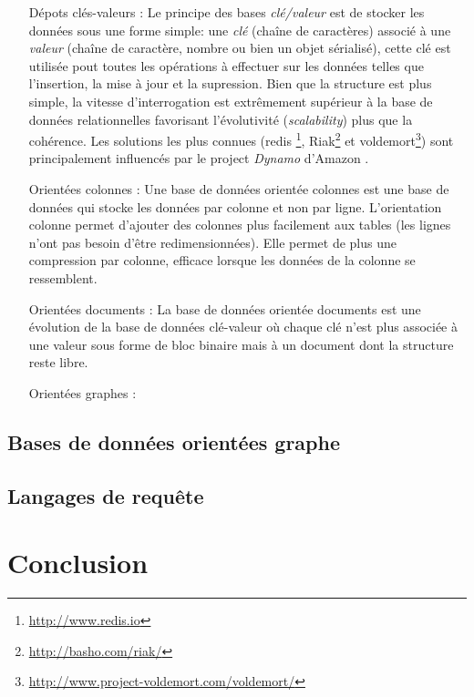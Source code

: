   \begin{itemize}
  \item [Dépots clés-valeurs]: Le principe des bases
    \textit{clé/valeur} est de stocker les données sous une forme
    simple: une \emph{clé } (chaîne de caractères) associé à une
    \emph{valeur} (chaîne de caractère, nombre ou bien un objet
    sérialisé), cette clé est utilisée pout toutes les opérations à
    effectuer sur les données telles que l'insertion, la mise à jour
    et la supression. Bien que la structure est plus simple, la
    vitesse d'interrogation est extrêmement supérieur à la base de
    données relationnelles favorisant l'évolutivité
    (\emph{scalability}) plus que la cohérence. Les solutions les plus
    connues (redis \footnote{\url{http://www.redis.io}},
    Riak\footnote{\url{http://basho.com/riak/}} et
    voldemort\footnote{\url{http://www.project-voldemort.com/voldemort/}})
    sont principalement influencés par le project \emph{Dynamo}
    d'Amazon \cite{decandia2007dynamo}.

  \item [Orientées colonnes]: Une base de données orientée colonnes
    est une base de données qui stocke les données par colonne et non
    par ligne. L'orientation colonne permet d'ajouter des colonnes
    plus facilement aux tables (les lignes n'ont pas besoin d'être
    redimensionnées). Elle permet de plus une compression par colonne,
    efficace lorsque les données de la colonne se ressemblent.

  \item [Orientées documents]: La base de données orientée documents
    est une évolution de la base de données clé-valeur où chaque clé
    n'est plus associée à une valeur sous forme de bloc binaire mais à
    un document dont la structure reste libre.

  \item [Orientées graphes]: %
  \end{itemize}

  \subsection{Bases de données orientées graphe}
  \label{sec:graph-database-overview}
  \subsection{Langages de requête}
  \label{query-languages}


\section{Conclusion}
\label{sec:conclusion-2}

